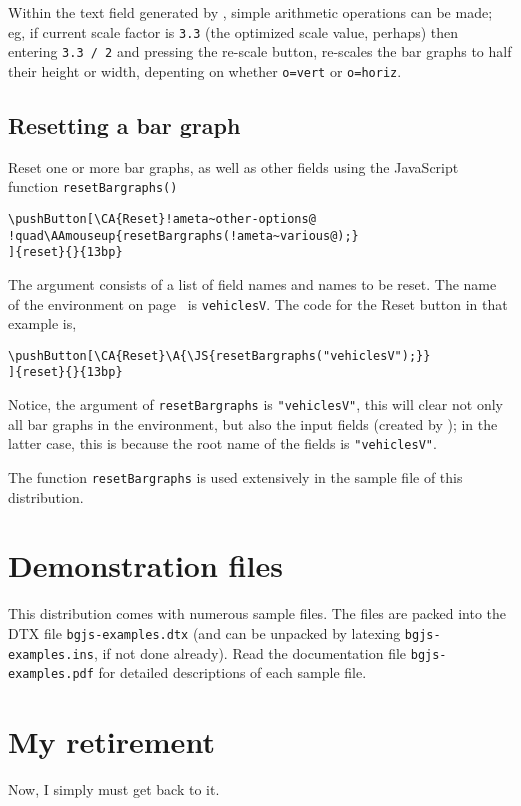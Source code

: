 \documentclass{article}
\let\uif\textsf
\edef\amtIndent{\the\parindent}
\begin{document}
Within the text field generated by , simple arithmetic
operations can be made; eg, if current scale factor is \texttt{3.3} (the
optimized scale value, perhaps) then entering \texttt{3.3\,/\,2} and pressing
the re-scale button, re-scales the bar graphs to half their height or width,
depenting on whether \texttt{o=vert} or \texttt{o=horiz}.


\subsection{Resetting a bar graph}

Reset one or more bar graphs, as well as other fields using the JavaScript function
\texttt{resetBargraphs()}
\begin{Verbatim}[xleftmargin=\amtIndent,commandchars={!~@}]
\pushButton[\CA{Reset}!ameta~other-options@
!quad\AAmouseup{resetBargraphs(!ameta~various@);}
]{reset}{}{13bp}
\end{Verbatim}
The  argument consists of a list of field names and
 names to be reset. The name of the 
environment on page~\pageref{intro} is \texttt{vehiclesV}. The code for
the \uif{Reset} button in that example is,
\begin{Verbatim}[xleftmargin=\amtIndent]
\pushButton[\CA{Reset}\A{\JS{resetBargraphs("vehiclesV");}}
]{reset}{}{13bp}\end{Verbatim}
Notice, the argument of \texttt{resetBargraphs} is \texttt{"vehiclesV"}, this will
clear not only all bar graphs in the  environment, but also the
input fields (created by ); in the latter case, this is because the
root name of the  fields is \texttt{"vehiclesV"}.

The function \texttt{resetBargraphs} is used extensively in the sample file
of this distribution.

\section{Demonstration files}

This distribution comes with numerous sample files. The files  are packed
into the DTX file \texttt{bgjs-examples.dtx} (and can be unpacked by latexing
\texttt{bgjs-examples.ins}, if not done already). Read the documentation file
\texttt{bgjs-examples.pdf} for detailed descriptions of each sample file.

\section{My retirement}

Now, I simply must get back to it. \dps
\end{document}
